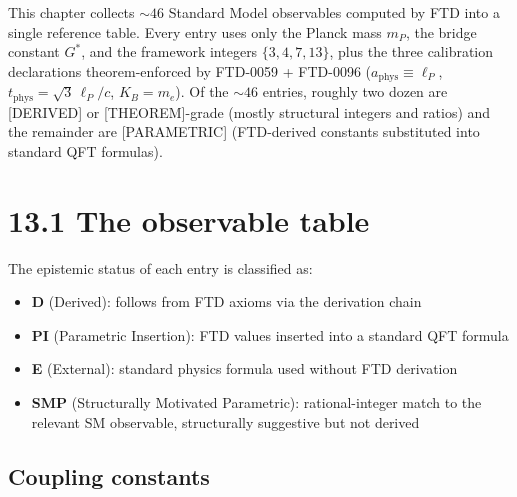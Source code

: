 \documentclass[
  11pt,
  letterpaper,
  twoside,
  openright]{book}
\providecommand{\tightlist}{%
  \setlength{\itemsep}{0pt}\setlength{\parskip}{0pt}}
\begin{document}
This chapter collects \(\sim 46\) Standard Model observables computed by
FTD into a single reference table. Every entry uses only the Planck mass
\(m_P\), the bridge constant \(G^*\), and the framework integers
\(\{3, 4, 7, 13\}\), plus the three calibration declarations
theorem-enforced by FTD-0059 + FTD-0096
(\(a_\mathrm{phys} \equiv \ell_P\),
\(t_\mathrm{phys} = \sqrt{3}\,\ell_P/c\), \(K_B = m_e\)). Of the
\(\sim 46\) entries, roughly two dozen are {[}DERIVED{]} or
{[}THEOREM{]}-grade (mostly structural integers and ratios) and the
remainder are {[}PARAMETRIC{]} (FTD-derived constants substituted into
standard QFT formulas).

\section{13.1 The observable table}\label{the-observable-table}

The epistemic status of each entry is classified as:

\begin{itemize}
\tightlist
\item
  \textbf{D} (Derived): follows from FTD axioms via the derivation chain
\item
  \textbf{PI} (Parametric Insertion): FTD values inserted into a
  standard QFT formula
\item
  \textbf{E} (External): standard physics formula used without FTD
  derivation
\item
  \textbf{SMP} (Structurally Motivated Parametric): rational-integer
  match to the relevant SM observable, structurally suggestive but not
  derived
\end{itemize}

\subsection{Coupling constants}\label{coupling-constants}
\end{document}
